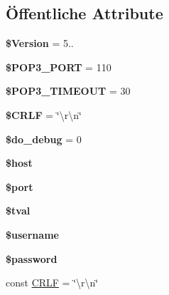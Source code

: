 \subsection*{Öffentliche Attribute}
\begin{DoxyCompactItemize}
\item 
\mbox{\label{class_p_o_p3_a2a7719920c947815dd27de33d72af8b1}} 
{\bfseries \$\+Version} = \textquotesingle{}5..\textquotesingle{}
\item 
\mbox{\label{class_p_o_p3_af023545d9cb0b63ca85bfd7efc667ff1}} 
{\bfseries \$\+P\+O\+P3\+\_\+\+P\+O\+RT} = 110
\item 
\mbox{\label{class_p_o_p3_a0b32b0438167c805b2af958b2499c21c}} 
{\bfseries \$\+P\+O\+P3\+\_\+\+T\+I\+M\+E\+O\+UT} = 30
\item 
\mbox{\label{class_p_o_p3_a1eacceb41d7076a02d699fbc76912ad6}} 
{\bfseries \$\+C\+R\+LF} = \char`\"{}\textbackslash{}r\textbackslash{}n\char`\"{}
\item 
\mbox{\label{class_p_o_p3_a4d933c1f22c2d1b909072b677a796911}} 
{\bfseries \$do\+\_\+debug} = 0
\item 
\mbox{\label{class_p_o_p3_a683d947d1cc315a29250652e2f3ce6f9}} 
{\bfseries \$host}
\item 
\mbox{\label{class_p_o_p3_a16746e61a0be526a36521f939fb4764d}} 
{\bfseries \$port}
\item 
\mbox{\label{class_p_o_p3_a61925db699ff6ff820394bfded5e8561}} 
{\bfseries \$tval}
\item 
\mbox{\label{class_p_o_p3_acbfb9ff11ef82c94fc9dcede0a7da15d}} 
{\bfseries \$username}
\item 
\mbox{\label{class_p_o_p3_ac749ff7e2312c1511dd94e9f7f88df5d}} 
{\bfseries \$password}
\item 
const \mbox{\hyperlink{class_p_o_p3_a5de802c27a18225db6247ced4e3caae9}{C\+R\+LF}} = \char`\"{}\textbackslash{}r\textbackslash{}n\char`\"{}
\end{DoxyCompactItemize}

